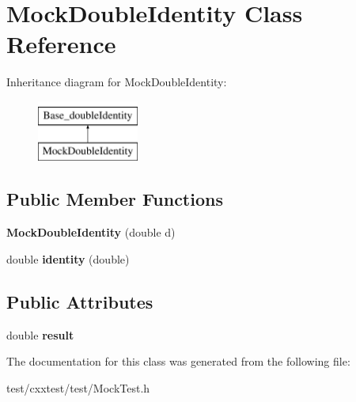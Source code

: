 \hypertarget{classMockDoubleIdentity}{\section{Mock\-Double\-Identity Class Reference}
\label{classMockDoubleIdentity}
}
Inheritance diagram for Mock\-Double\-Identity\-:\begin{figure}[H]
\begin{center}
\leavevmode
\includegraphics[height=2.000000cm]{classMockDoubleIdentity}
\end{center}
\end{figure}
\subsection*{Public Member Functions}
\begin{DoxyCompactItemize}
\item 
\hypertarget{classMockDoubleIdentity_ab66e81bb3b59555a3972460e9a8df858}{{\bfseries Mock\-Double\-Identity} (double d)}\label{classMockDoubleIdentity_ab66e81bb3b59555a3972460e9a8df858}

\item 
\hypertarget{classMockDoubleIdentity_a412efcaae94e979fb600c621644f081e}{double {\bfseries identity} (double)}\label{classMockDoubleIdentity_a412efcaae94e979fb600c621644f081e}

\end{DoxyCompactItemize}
\subsection*{Public Attributes}
\begin{DoxyCompactItemize}
\item 
\hypertarget{classMockDoubleIdentity_af1744039661df78b37507884af95ea62}{double {\bfseries result}}\label{classMockDoubleIdentity_af1744039661df78b37507884af95ea62}

\end{DoxyCompactItemize}


The documentation for this class was generated from the following file\-:\begin{DoxyCompactItemize}
\item 
test/cxxtest/test/Mock\-Test.\-h\end{DoxyCompactItemize}
